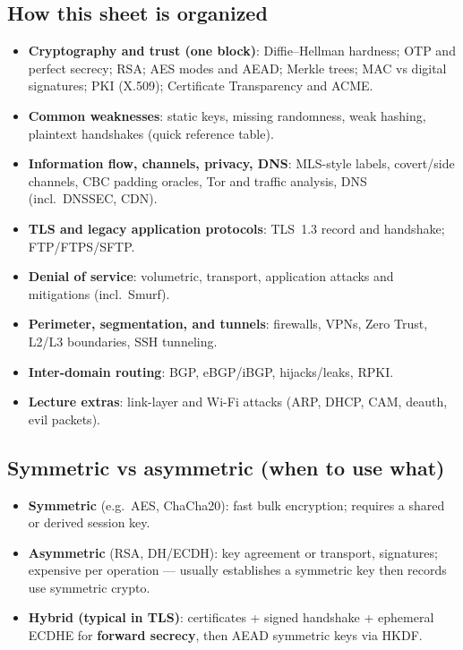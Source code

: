 \documentclass[12pt]{article}
\begin{document}
\subsection{How this sheet is organized}
\begin{itemize}
  \item \textbf{Cryptography and trust (one block)}: Diffie--Hellman hardness; OTP and perfect secrecy; RSA; AES modes and AEAD; Merkle trees; MAC vs digital signatures; PKI (X.509); Certificate Transparency and ACME.
  \item \textbf{Common weaknesses}: static keys, missing randomness, weak hashing, plaintext handshakes (quick reference table).
  \item \textbf{Information flow, channels, privacy, DNS}: MLS-style labels, covert/side channels, CBC padding oracles, Tor and traffic analysis, DNS (incl.\ DNSSEC, CDN).
  \item \textbf{TLS and legacy application protocols}: TLS~1.3 record and handshake; FTP/FTPS/SFTP.
  \item \textbf{Denial of service}: volumetric, transport, application attacks and mitigations (incl.\ Smurf).
  \item \textbf{Perimeter, segmentation, and tunnels}: firewalls, VPNs, Zero Trust, L2/L3 boundaries, SSH tunneling.
  \item \textbf{Inter-domain routing}: BGP, eBGP/iBGP, hijacks/leaks, RPKI.
  \item \textbf{Lecture extras}: link-layer and Wi-Fi attacks (ARP, DHCP, CAM, deauth, evil packets).
\end{itemize}

\subsection{Symmetric vs asymmetric (when to use what)}
\begin{itemize}
  \item \textbf{Symmetric} (e.g.\ AES, ChaCha20): fast bulk encryption; requires a shared or derived session key.
  \item \textbf{Asymmetric} (RSA, DH/ECDH): key agreement or transport, signatures; expensive per operation --- usually establishes a symmetric key then records use symmetric crypto.
  \item \textbf{Hybrid (typical in TLS)}: certificates + signed handshake + ephemeral ECDHE for \textbf{forward secrecy}, then AEAD symmetric keys via HKDF.
\end{itemize}
\end{document}
